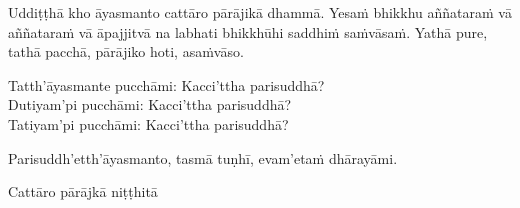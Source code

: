 \medskip

\begin{center}
Uddiṭṭhā kho āyasmanto cattāro pārājikā dhammā. Yesaṁ bhikkhu aññataraṁ vā aññataraṁ vā āpajjitvā na labhati bhikkhūhi saddhiṁ saṁvāsaṁ. Yathā pure, tathā pacchā, pārājiko hoti, asaṁvāso.

\smallskip

Tatth'āyasmante pucchāmi: Kacci'ttha parisuddhā?\\
Dutiyam'pi pucchāmi: Kacci'ttha parisuddhā?\\
Tatiyam'pi pucchāmi: Kacci'ttha parisuddhā?

\smallskip

Parisuddh'etth'āyasmanto, tasmā tuṇhī, evam'etaṁ dhārayāmi.
\end{center}

\begin{outro}
  Cattāro pārājkā niṭṭhitā\makeatletter\hyperlink{endnote10-appendix}\makeatother
\end{outro}

\clearpage
